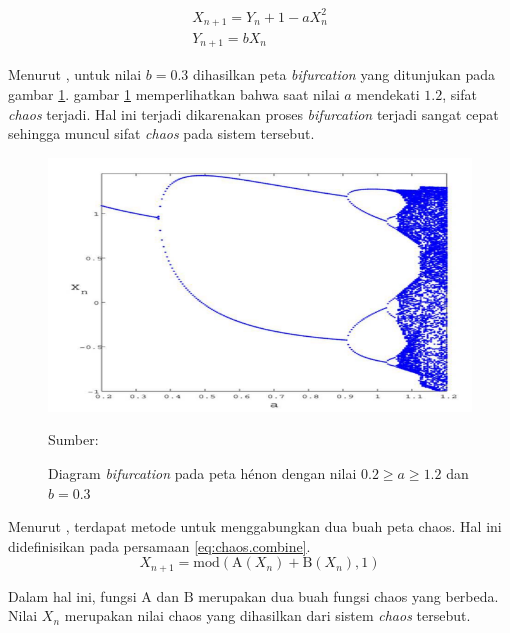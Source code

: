 \begin{equation}
  \label{eq:chaos.henon}
  \begin{array}{l}   
  X_{n+1} = Y_{n} + 1 - aX_{n}^2 \\
  Y_{n+1} = bX_{n} 
  \end{array}
\end{equation}

Menurut \textcite{aybar2013}, untuk nilai $b = 0.3$ dihasilkan peta \emph{bifurcation} yang ditunjukan pada gambar \ref{fig:henon.bifurcation}. gambar \ref{fig:henon.bifurcation} memperlihatkan bahwa saat nilai $a$ mendekati $1.2$, sifat \emph{chaos} terjadi. Hal ini terjadi dikarenakan proses \emph{bifurcation} terjadi sangat cepat sehingga muncul sifat \emph{chaos} pada sistem tersebut.

\begin{figure}[!h]
  \centering
  \includegraphics[width=\textwidth]{chapters/res/chapter-2/img/henon.bifurcation.png}
  \caption{Diagram \emph{bifurcation} pada peta hénon dengan nilai $0.2 \ge a \ge 1.2$ dan $b = 0.3$} \label{fig:henon.bifurcation}
  Sumber: \textcite{aybar2013}
\end{figure}

Menurut \textcite{patel2021}, terdapat metode untuk menggabungkan dua buah peta chaos. Hal ini didefinisikan pada persamaan \ref{eq:chaos.combine}.
\begin{equation}
  \label{eq:chaos.combine}
  X_{n+1} = \text{mod}(\text{A}(X_n) + \text{B}(X_n), 1)
\end{equation}

Dalam hal ini, fungsi $\text{A}$ dan $\text{B}$ merupakan dua buah fungsi chaos yang berbeda. Nilai $X_n$ merupakan nilai chaos yang dihasilkan dari sistem \emph{chaos} tersebut.
  
